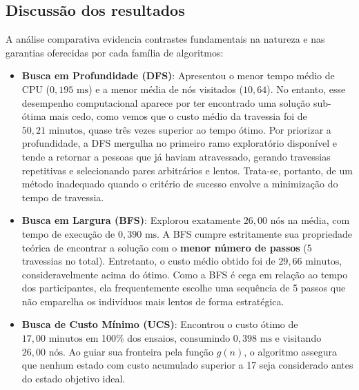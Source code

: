 \subsection{Discussão dos resultados}
\label{subsec:discussao}

A análise comparativa evidencia contrastes fundamentais na natureza e nas garantias
oferecidas por cada família de algoritmos:

\begin{itemize}[leftmargin=1.5cm]
	\item \textbf{Busca em Profundidade (DFS)}: Apresentou o menor tempo médio de CPU
	      ($0{,}195\text{ ms}$) e a menor média de nós visitados ($10{,}64$). No entanto, esse
	      desempenho computacional aparece por ter encontrado uma solução sub-ótima mais cedo,
	      como vemos que o custo médio da travessia foi de $50{,}21\text{ minutos}$, quase três
	      vezes superior ao tempo ótimo. Por priorizar a profundidade, a DFS mergulha no
	      primeiro ramo exploratório disponível e tende a retornar a pessoas que já haviam
	      atravessado, gerando travessias repetitivas e selecionando pares arbitrários e
	      lentos. Trata-se, portanto, de um método inadequado quando o critério de sucesso
	      envolve a minimização do tempo de travessia.

	\item \textbf{Busca em Largura (BFS)}: Explorou exatamente $26{,}00\text{ nós}$ na
	      média, com tempo de execução de $0{,}390\text{ ms}$. A BFS cumpre estritamente sua
	      propriedade teórica de encontrar a solução com o \textbf{menor número de passos}
	      (5 travessias no total). Entretanto, o custo médio obtido foi de
	      $29{,}66\text{ minutos}$, consideravelmente acima do ótimo. Como a BFS é cega em
	      relação ao tempo dos participantes, ela frequentemente escolhe uma sequência de
	      5 passos que não emparelha os indivíduos mais lentos de forma estratégica.

	\item \textbf{Busca de Custo Mínimo (UCS)}: Encontrou o custo ótimo de
	      $17{,}00\text{ minutos}$ em 100\% dos ensaios, consumindo $0{,}398\text{ ms}$ e
	      visitando $26{,}00\text{ nós}$. Ao guiar sua fronteira pela função $g(n)$,
	      o algoritmo assegura que nenhum estado com custo acumulado superior a 17 seja
	      considerado antes do estado objetivo ideal.


\end{itemize}
